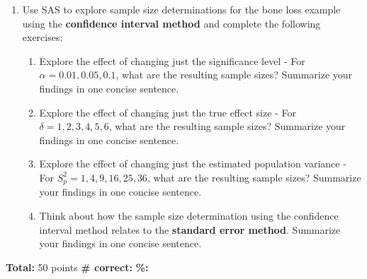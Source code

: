 \documentclass[11pt]{article}
\begin{document}
\begin{enumerate}
\vspace{12pt}
\item Use SAS to explore sample size determinations for the bone loss example using the \textbf{confidence interval method} and complete the following exercises:
	\begin{enumerate}
	\item Explore the effect of changing just the significance level - For $\alpha = 0.01, 0.05, 0.1$, what are the resulting sample sizes? Summarize your findings in one concise sentence.
	\item Explore the effect of changing just the true effect size - For $\delta = 1, 2, 3, 4, 5, 6$, what are the resulting sample sizes? Summarize your findings in one concise sentence.
	\item Explore the effect of changing just the estimated population variance - For $S_p^2 = 1, 4, 9, 16, 25, 36$, what are the resulting sample sizes? Summarize your findings in one concise sentence.
	\item Think about how the sample size determination using the confidence interval method relates to the \textbf{standard error method}. Summarize your findings in one concise sentence.
	\end{enumerate}
\end{enumerate}

\vfill
\textbf{Total:} 50 points \hspace{14pt} \textbf{\# correct:} \underline{\hspace{1in}}  \hspace{14pt} \textbf{\%:} \underline{\hspace{1in}} 
\end{document}
